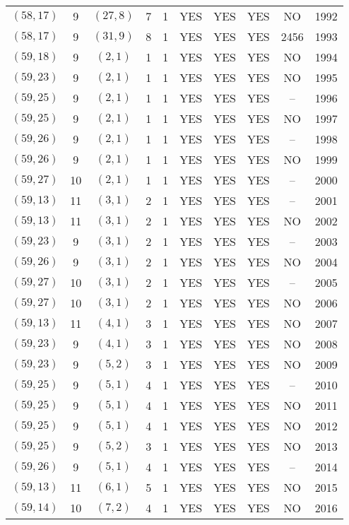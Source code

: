 \begin{longtable}{|c|c|c|c|c|c|c|c|c|c|}
$(58, 17)$ & 9 & $(27, 8)$ & 7 & 1 & YES & YES & YES & NO & 1992\\
$(58, 17)$ & 9 & $(31, 9)$ & 8 & 1 & YES & YES & YES & 2456 & 1993\\
$(59, 18)$ & 9 & $(2, 1)$ & 1 & 1 & YES & YES & YES & NO & 1994\\
$(59, 23)$ & 9 & $(2, 1)$ & 1 & 1 & YES & YES & YES & NO & 1995\\
$(59, 25)$ & 9 & $(2, 1)$ & 1 & 1 & YES & YES & YES & -- & 1996\\
$(59, 25)$ & 9 & $(2, 1)$ & 1 & 1 & YES & YES & YES & NO & 1997\\
$(59, 26)$ & 9 & $(2, 1)$ & 1 & 1 & YES & YES & YES & -- & 1998\\
$(59, 26)$ & 9 & $(2, 1)$ & 1 & 1 & YES & YES & YES & NO & 1999\\
$(59, 27)$ & 10 & $(2, 1)$ & 1 & 1 & YES & YES & YES & -- & 2000\\
$(59, 13)$ & 11 & $(3, 1)$ & 2 & 1 & YES & YES & YES & -- & 2001\\
$(59, 13)$ & 11 & $(3, 1)$ & 2 & 1 & YES & YES & YES & NO & 2002\\
$(59, 23)$ & 9 & $(3, 1)$ & 2 & 1 & YES & YES & YES & -- & 2003\\
$(59, 26)$ & 9 & $(3, 1)$ & 2 & 1 & YES & YES & YES & NO & 2004\\
$(59, 27)$ & 10 & $(3, 1)$ & 2 & 1 & YES & YES & YES & -- & 2005\\
$(59, 27)$ & 10 & $(3, 1)$ & 2 & 1 & YES & YES & YES & NO & 2006\\
$(59, 13)$ & 11 & $(4, 1)$ & 3 & 1 & YES & YES & YES & NO & 2007\\
$(59, 23)$ & 9 & $(4, 1)$ & 3 & 1 & YES & YES & YES & NO & 2008\\
$(59, 23)$ & 9 & $(5, 2)$ & 3 & 1 & YES & YES & YES & NO & 2009\\
$(59, 25)$ & 9 & $(5, 1)$ & 4 & 1 & YES & YES & YES & -- & 2010\\
$(59, 25)$ & 9 & $(5, 1)$ & 4 & 1 & YES & YES & YES & NO & 2011\\
$(59, 25)$ & 9 & $(5, 1)$ & 4 & 1 & YES & YES & YES & NO & 2012\\
$(59, 25)$ & 9 & $(5, 2)$ & 3 & 1 & YES & YES & YES & NO & 2013\\
$(59, 26)$ & 9 & $(5, 1)$ & 4 & 1 & YES & YES & YES & -- & 2014\\
$(59, 13)$ & 11 & $(6, 1)$ & 5 & 1 & YES & YES & YES & NO & 2015\\
$(59, 14)$ & 10 & $(7, 2)$ & 4 & 1 & YES & YES & YES & NO & 2016\\

\end{longtable}
